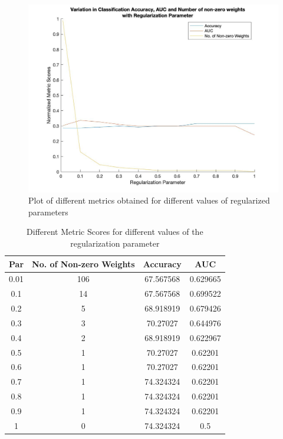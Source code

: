 \documentclass[11pt]{article}
\begin{document}
\begin{figure}
	\centering
	\begin{adjustbox}{width=0.65\paperwidth}
			\includegraphics{Codes/Results/L1 Logistic Train/Metric_Variance} 
	\end{adjustbox}
	\caption{Plot of different metrics obtained for different values of regularized parameters}
	\label{fig:metric_scores}
\end{figure}


\begin{table}
	\centering
	\begin{tabular}{|c|c|c|c|}
		\hline
		\textbf{Par} & \textbf{No. of Non-zero Weights} & \textbf{Accuracy} & \textbf{AUC} \\ \hline
		0.01 & 106 & 67.567568 & 0.629665 \\ \hline
		0.1 & 14 & 67.567568 & 0.699522 \\ \hline
		0.2 & 5 & 68.918919 & 0.679426 \\ \hline
		0.3 & 3 & 70.27027 & 0.644976 \\ \hline
		0.4 & 2 & 68.918919 & 0.622967 \\ \hline
		0.5 & 1 & 70.27027 & 0.62201 \\ \hline
		0.6 & 1 & 70.27027 & 0.62201 \\ \hline
		0.7 & 1 & 74.324324 & 0.62201 \\ \hline
		0.8 & 1 & 74.324324 & 0.62201 \\ \hline
		0.9 & 1 & 74.324324 & 0.62201 \\ \hline
		1 & 0 & 74.324324 & 0.5 \\ \hline
	\end{tabular}
	\caption{Different Metric Scores for different values of the regularization parameter}
	\label{tab:metric_scores}
\end{table}
\end{document}
